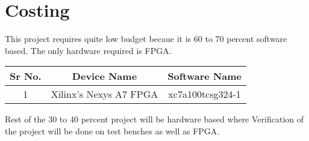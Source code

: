 
\chapter{Costing}
\label{Chapter10}

This project requires quite low budget becaue it is 60 to 70 percent software based. The only hardware required is FPGA.

\begin{center}

\begin{tabular}{|c|c|c|} 
 \hline
Sr No. & Device Name & Software Name \\ [0.5ex] 
 \hline
 1 & Xilinx's Nexys A7 FPGA & xc7a100tcsg324-1 \\ [1ex]
 \hline
\end{tabular}

\end{center}

Rest of the 30 to 40 percent project will be hardware based where Verification of the project will be done on test benches as well as FPGA.